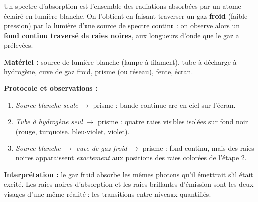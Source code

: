 \documentclass[11pt]{article}
\newcommand{\cle}[1]{{\popxbold\color{popdark}#1}}
\begin{document}
\begin{definition}
Un \cle{spectre d'absorption} est l'ensemble des radiations absorbées par un atome éclairé en lumière blanche. On l'obtient en faisant traverser un gaz \textbf{froid} (faible pression) par la lumière d'une source de spectre continu : on observe alors un \textbf{fond continu traversé de raies noires}, aux longueurs d'onde que le gaz a prélevées.
\end{definition}

\begin{experience}
\textbf{Matériel :} source de lumière blanche (lampe à filament), tube à décharge à hydrogène, cuve de gaz froid, prisme (ou réseau), fente, écran.

\textbf{Protocole et observations :}
\begin{enumerate}
\item \emph{Source blanche seule} $\rightarrow$ prisme : bande continue arc-en-ciel sur l'écran.
\item \emph{Tube à hydrogène seul} $\rightarrow$ prisme : quatre raies visibles isolées sur fond noir (rouge, turquoise, bleu-violet, violet).
\item \emph{Source blanche} $\rightarrow$ \emph{cuve de gaz froid} $\rightarrow$ prisme : fond continu, mais des raies noires apparaissent \emph{exactement} aux positions des raies colorées de l'étape 2.
\end{enumerate}

\textbf{Interprétation :} le gaz froid absorbe les mêmes photons qu'il émettrait s'il était excité. Les raies noires d'absorption et les raies brillantes d'émission sont les deux visages d'une même réalité : les transitions entre niveaux quantifiés.
\end{experience}
\end{document}
